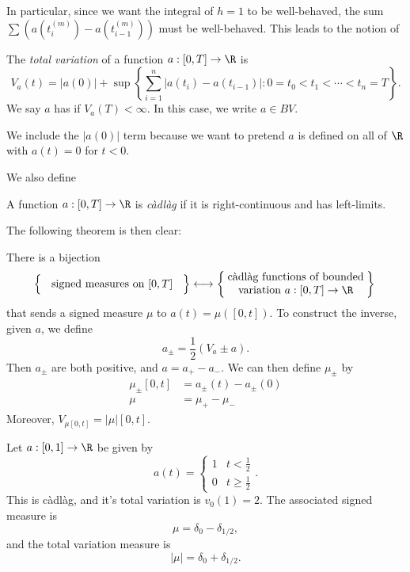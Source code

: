 \documentclass[a4paper]{article}
\begin{document}
In particular, since we want the integral of $h = 1$ to be well-behaved, the sum $\sum (a(t_i^{(m)}) - a(t_{i - 1}^{(m)}))$ must be well-behaved. This leads to the notion of
\begin{defi}
  The \emph{total variation} of a function $a: [0, T] \to \R$ is
  \[
    V_a(t) = |a(0)| + \sup \left\{\sum_{i = 1}^n |a(t_i) - a(t_{i - 1})|: 0 = t_0 < t_1 < \cdots < t_n = T\right\}.
  \]
  We say $a$ has  if $V_a(T) < \infty$. In this case, we write $a \in BV$.
\end{defi}
We include the $|a(0)|$ term because we want to pretend $a$ is defined on all of $\R$ with $a(t) = 0$ for $t < 0$.

We also define
\begin{defi}[C\`adl\`ag]
  A function $a: [0, T] \to \R$ is \emph{c\`adl\`ag} if it is right-continuous and has left-limits.
\end{defi}

The following theorem is then clear:
\begin{thm}
  There is a bijection
  \[
    \left\{\vphantom{\parbox{4.5cm}{a\\b}}\parbox{4.5cm}{\centering signed measures on $[0, T]$} \right\} \longleftrightarrow \left\{\parbox{4.5cm}{\centering c\`adl\`ag functions of bounded variation $a: [0, T] \to \R$}\right\}\\
  \]
  that sends a signed measure $\mu$ to $a(t) = \mu([0, t])$. To construct the inverse, given $a$, we define
  \[
    a_{\pm} = \frac{1}{2}(V_a \pm a).
  \]
  Then $a_{\pm}$ are both positive, and $a = a_+ - a_-$. We can then define $\mu_{\pm}$ by
  \begin{align*}
    \mu_{\pm}[0, t] &= a_{\pm}(t) - a_{\pm}(0)\\
    \mu &= \mu_+ - \mu_-
  \end{align*}
  Moreover, $V_{\mu[0, t]} = |\mu|[0, t]$.
\end{thm}

\begin{eg}
  Let $a: [0, 1] \to \R$ be given by
  \[
    a(t) =
    \begin{cases}
      1 & t < \frac{1}{2}\\
      0 & t \geq \frac{1}{2}
    \end{cases}.
  \]
  This is c\`adl\`ag, and it's total variation is $v_0(1) = 2$. The associated signed measure is
  \[
    \mu = \delta_0 - \delta_{1/2},
  \]
  and the total variation measure is
  \[
    |\mu| = \delta_0 + \delta_{1/2}.
  \]
\end{eg}
\end{document}
